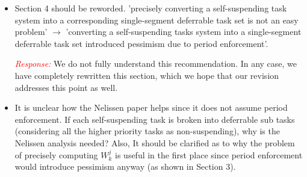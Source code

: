 \documentclass[12pt]{article}
\newenvironment{response}[0]{\textcolor{red}{\emph{Response: }}\color{blue}}{\medskip}
\newcommand{\action}[1]{\textcolor{red}{\emph{\it Actions taken: }}{\color{blue}#1}\medskip}
\begin{document}
\begin{itemize}
\begin{response}
\end{response}

\action{Section 2 was rewritten and expanded to clearly distinguish between the runtime rule (Section 2.2) and the classic analysis (Section 2.3). The runtime rule --- Equation (1) --- is stated in terms of multi-segmented deferrable tasks. }

\action{Section 4 was completely rewritten to more clearly explain that the problem of finding a suitable corresponding task set is open, and likely difficult.}


	\item 
Section 4 should be reworded. 'precisely converting a self-suspending task
system into a corresponding single-segment deferrable task set is not an
easy problem'  $\rightarrow$  'converting a self-suspending tasks system into a
single-segment deferrable task set introduced pessimism due to period
enforcement'. 

\begin{response}
We do not fully understand this recommendation. In any case, we have
completely rewritten this section, which we hope that our revision addresses this point as well.
\end{response}

\item 
It is unclear how the Nelissen paper helps since it does not
assume period enforcement. If each self-suspending task is broken into
deferrable sub tasks (considering all the higher priority tasks as
non-suspending), why is the Nelissen analysis needed? Also, It should be
clarified as to why the problem of precisely computing $W_k^{j}$ is useful in
the first place since period enforcement would introduce pessimism anyway
(as shown in Section 3).




\end{itemize}
\end{document}
